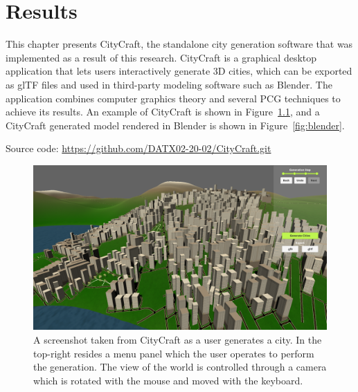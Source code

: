 \chapter{Results}

This chapter presents CityCraft, the standalone city generation software that was implemented as a result of this research.
CityCraft is a graphical desktop application that lets users interactively generate 3D cities, which can be exported as glTF files and used in third-party modeling software such as Blender.
The application combines computer graphics theory and several PCG techniques to achieve its results.
An example of CityCraft is shown in Figure~\ref{fig:screenshot}, and a CityCraft generated model rendered in Blender is shown in Figure~\ref{fig:blender}.

Source code: \url{https://github.com/DATX02-20-02/CityCraft.git}

\begin{figure}[H]
  \centering
  \includegraphics[width=\textwidth]{figure/results/screenshot.png}

  \caption{A screenshot taken from CityCraft as a user generates a city. In the top-right resides a menu panel which the user operates to perform the generation. The view of the world is controlled through a camera which is rotated with the mouse and moved with the keyboard.}
  \label{fig:screenshot}
\end{figure}

